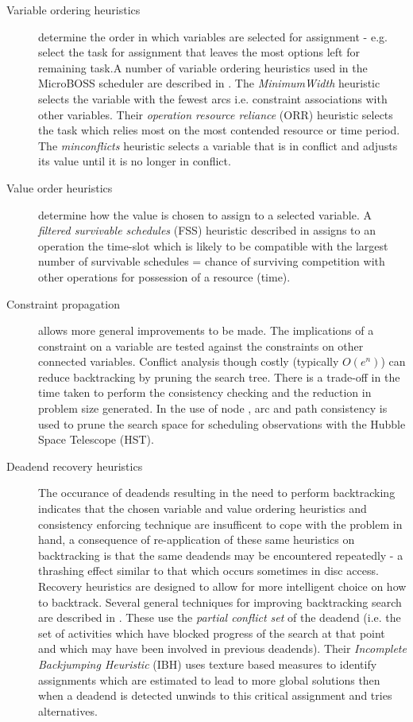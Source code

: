 \documentclass[12pt,a4paper]{article}
\begin{document}
\begin{description}
\item[Variable ordering heuristics]
determine the order in which variables are selected for assignment - e.g. select the task for assignment that leaves the most options left for remaining task.A number of variable ordering heuristics used in the MicroBOSS scheduler are described in \citep{sadeh91lookahead}. The \emph{MinimumWidth} heuristic selects the variable with the fewest arcs i.e. constraint associations with other variables. Their \emph{operation resource reliance} (ORR) heuristic selects the task which relies most on the most contended resource or time period. The \emph{minconflicts} heuristic \citep{minton92minconflicts} selects a variable that is in conflict and adjusts its value until it is no longer in conflict.

\item[Value order heuristics]
determine how the value is chosen to assign to a selected variable. A \emph{filtered survivable schedules} (FSS) heuristic described in \citep{sadeh91lookahead} assigns to an operation the time-slot which is likely to be compatible with the largest number of survivable schedules = chance of surviving competition with other operations for possession of a resource (time).

\item[Constraint propagation]
allows more general improvements to be made. The implications of a constraint on a variable are tested against the constraints on other connected variables. Conflict analysis though costly (typically $O(e^n)$) \citep{muscettola92bottleneck} can reduce backtracking by pruning the search tree. There is a trade-off in the time taken to perform the consistency checking and the reduction in problem size generated. In \citep{johnston94spike} the use of node , arc and path consistency is used to prune the search space for scheduling observations with the Hubble Space Telescope (HST). 

\item[Deadend recovery heuristics] 
The occurance of deadends resulting in the need to perform backtracking indicates that the chosen variable and value ordering heuristics and consistency enforcing technique are insufficent to cope with the problem in hand, a consequence of re-application of these same heuristics on backtracking is that the same deadends may be encountered repeatedly - a thrashing effect similar to that which occurs sometimes in disc access. Recovery heuristics are designed to allow for more intelligent choice on how to backtrack. Several general techniques for improving backtracking search are described in \citep{sadeh94backtracking}. These use the \emph{partial conflict set} of the deadend (i.e. the set of activities which have blocked progress of the search at that point and which may have been involved in previous deadends). Their \emph{Incomplete Backjumping Heuristic} (IBH) uses texture based measures \citep{beck97texturebased} to identify assignments which are estimated to lead to more global solutions then when a deadend is detected unwinds to this critical assignment and tries alternatives.

\end{description}
\end{document}
